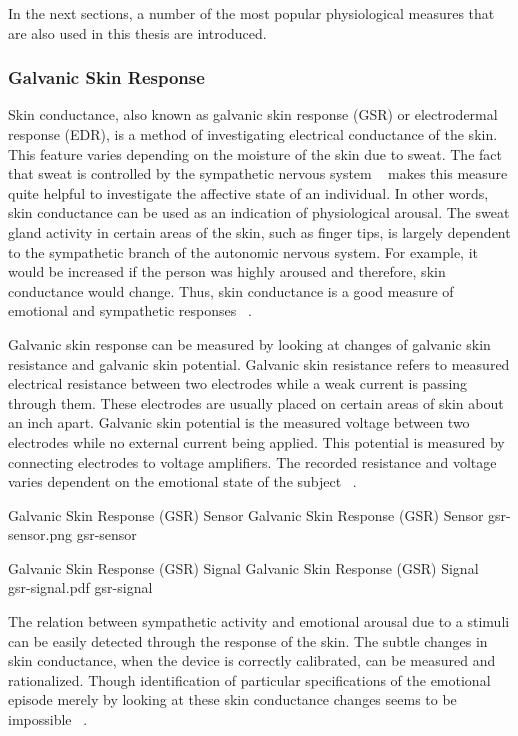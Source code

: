 In the next sections, a number of the most popular physiological measures that are also used in this thesis are introduced.

\subsubsection{Galvanic Skin Response}
Skin conductance, also known as galvanic skin response (GSR) or electrodermal response (EDR), is a method of investigating electrical conductance of the skin. This feature varies depending on the moisture of the skin due to sweat. The fact that sweat is controlled by the sympathetic nervous system ~\cite{seiger2002essentials} makes this measure quite helpful to investigate the affective state of an individual. In other words, skin conductance can be used as an indication of physiological arousal. The sweat gland activity in certain areas of the skin, such as finger tips, is largely dependent to the sympathetic branch of the autonomic nervous system. For example, it would be increased if the person was highly aroused and therefore, skin conductance would change. Thus, skin conductance is a good measure of emotional and sympathetic responses ~\cite{carlson2013physiology}.

Galvanic skin response can be measured by looking at changes of galvanic skin resistance and galvanic skin potential. Galvanic skin resistance refers to measured electrical resistance between two electrodes while a weak current is passing through them. These electrodes are usually placed on certain areas of skin about an inch apart. Galvanic skin potential is the measured voltage between two electrodes while no external current being applied. This potential is measured by connecting electrodes to voltage amplifiers. The recorded resistance and voltage varies dependent on the emotional state of the subject ~\cite{pflanzer2013galvanic}.

\img
{Galvanic Skin Response (GSR) Sensor}
{Galvanic Skin Response (GSR) Sensor}
{gsr-sensor.png}
{gsr-sensor}

\img
{Galvanic Skin Response (GSR) Signal}
{Galvanic Skin Response (GSR) Signal ~\cite{wiki2014gsr}}
{gsr-signal.pdf}
{gsr-signal}

The relation between sympathetic activity and emotional arousal due to a stimuli can be easily detected through the response of the skin. The subtle changes in skin conductance, when the device is correctly calibrated, can be measured and rationalized. Though identification of particular specifications of the emotional episode merely by looking at these skin conductance changes seems to be impossible ~\cite{pflanzer2013galvanic}.

